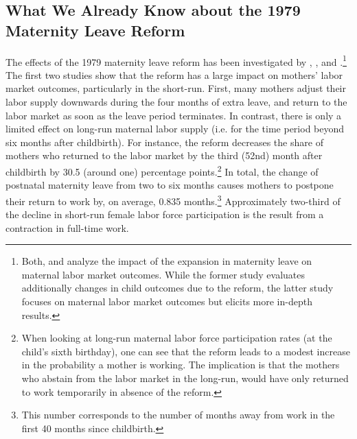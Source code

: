 \documentclass[11pt, a4paper]{article} %
\begin{document}
\subsection{What We Already Know about the 1979 Maternity Leave Reform}
The effects of the 1979 maternity leave reform has been investigated by \cite{Dustmann2012}, \cite{schonberg2014expansions}, and \cite{guertzgen2018}.\footnote{Both, \cite{Dustmann2012} and \cite{schonberg2014expansions} analyze the impact of the expansion in maternity leave on maternal labor market outcomes. While the former study evaluates additionally changes in child outcomes due to the reform, the latter study focuses on maternal labor market outcomes but elicits more in-depth results.} The first two studies show that the reform has a large impact on mothers' labor market outcomes, particularly in the short-run. \newline First, many mothers adjust their labor supply downwards during the four months of extra leave, and return to the labor market as soon as the leave period terminates. In contrast, there is only a limited effect on long-run maternal labor supply (i.e. for the time period beyond six months after childbirth). For instance, the reform decreases the share of mothers who returned to the labor market by the third (52nd) month after childbirth by 30.5 (around one) percentage points.\footnote{When looking at long-run maternal labor force participation rates (at the child's sixth birthday), one can see that the reform leads to a modest increase in the probability a mother is working. The implication is that the mothers who abstain from the labor market in the long-run, would have only returned to work temporarily in absence of the reform.}
In total, the change of postnatal maternity leave from two to six months causes mothers to postpone their return to work by, on average, 0.835 months.\footnote{This number corresponds to the number of months away from work in the first 40 months since childbirth.} Approximately two-third of the decline in short-run female labor force participation is the result from a contraction in full-time work. \newline
\end{document}
